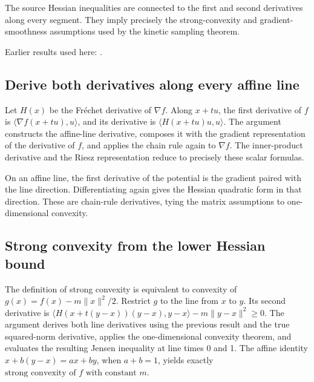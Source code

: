 \documentclass[11pt,a4paper]{report}
\begin{document}
The source Hessian inequalities are connected to the first and second derivatives along every segment. They imply precisely the strong-convexity and gradient-smoothness assumptions used by the kinetic sampling theorem.



Earlier results used here: \cite[Section~3.2]{LangevinLean2026ULASC}.
\subsection{\texorpdfstring{Derive both derivatives along every affine line}{Derive both derivatives along every affine line}}
\label{report-step-KineticLangevin-HessianAssumptions-lean-1}


Let \(H(x)\) be the Fréchet derivative of \(\nabla f\). Along \(x+tu\), the first derivative of \(f\) is \(\langle\nabla f(x+tu),u\rangle\), and its derivative is \(\langle H(x+tu)u,u\rangle\). The argument constructs the affine-line derivative, composes it with the gradient representation of the derivative of \(f\), and applies the chain rule again to \(\nabla f\). The inner-product derivative and the Riesz representation reduce to precisely these scalar formulas.



On an affine line, the first derivative of the potential is the gradient paired with the line direction. Differentiating again gives the Hessian quadratic form in that direction. These are chain-rule derivatives, tying the matrix assumptions to one-dimensional convexity.

\subsection{\texorpdfstring{Strong convexity from the lower Hessian bound}{Strong convexity from the lower Hessian bound}}
\label{report-step-KineticLangevin-HessianAssumptions-lean-2}


The definition of strong convexity is equivalent to convexity of \(g(x)=f(x)-m\|x\|^2/2\). Restrict \(g\) to the line from \(x\) to \(y\). Its second derivative is \(\langle H(x+t(y-x))(y-x),y-x\rangle-m\|y-x\|^2\ge0\). The argument derives both line derivatives using the previous result and the true squared-norm derivative, applies the one-dimensional convexity theorem, and evaluates the resulting Jensen inequality at line times 0 and 1. The affine identity \(x+b(y-x)=ax+by\), when \(a+b=1\), yields exactly \(\text{strong convexity of }f\text{ with constant }m\).
\end{document}
